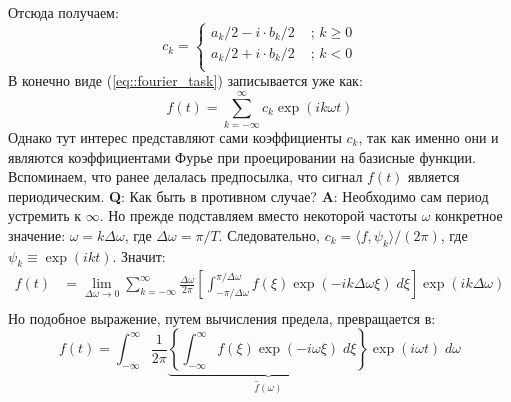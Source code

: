 Отсюда получаем:
\begin{equation}
	c_k = \left\{
	\begin{array}{rl}
		a_k / 2 - i \cdot b_k/ 2  & \text{ ; } k \ge 0\\ 
		a_k / 2 + i \cdot b_k/ 2  & \text{ ; } k < 0\\ 
	\end{array}
	\right.
\end{equation}
В конечно виде (\ref{eq::fourier_task}) записывается уже как:
\begin{equation}
	f(t) = \sum_{k = -\infty}^{\infty} c_k \exp(i k \omega t)
\end{equation}
Однако тут интерес представляют сами коэффициенты $c_k$, так как именно они и являются коэффициентами Фурье при проецировании на базисные функции. Вспоминаем, что ранее делалась предпосылка, что сигнал $f(t)$ является периодическим. \textbf{Q}: Как быть в противном случае? \textbf{A}: Необходимо сам период устремить к $\infty$. Но прежде подставляем вместо некоторой частоты $\omega$ конкретное значение: $\omega = k \Delta \omega$, где $\Delta \omega = \pi / T$. Следовательно, $c_k = \langle f, \psi_k\rangle / (2 \pi)$, где $\psi_k \equiv \exp(i k t)$. Значит:
\begin{equation}
	\begin{split}
		f(t) & = \lim_{\Delta \omega \to 0} \sum_{k = -\infty}^{\infty} \frac{\Delta \omega}{2 \pi} \left[\int_{-\pi / \Delta \omega}^{\pi / \Delta \omega} f(\xi) \exp(-i k \Delta \omega \xi) \; d \xi\right] \exp(i k \Delta \omega)\\
	\end{split}	
\end{equation}
Но подобное выражение, путем вычисления предела, превращается в:
\begin{equation}
	f(t) = \int_{-\infty}^{\infty} \frac{1}{2\pi} \underbrace{\left\{\int_{-\infty}^{\infty} f(\xi) \exp(-i \omega \xi) \; d \xi \right\}}_{\hat{f}(\omega)} \exp(i \omega t) \; d \omega
\end{equation}